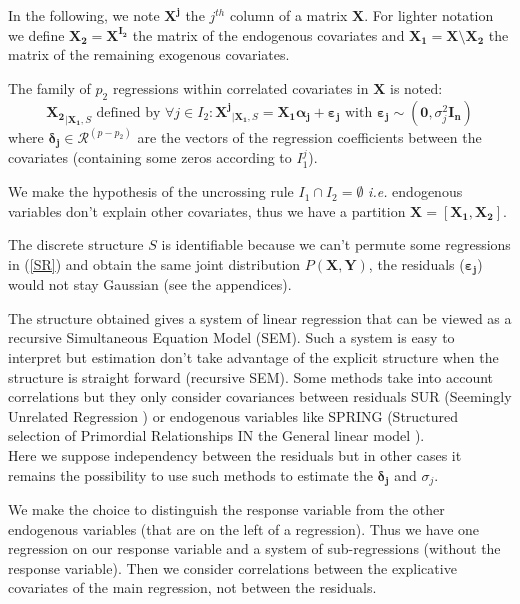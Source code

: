 \documentclass[11pt,a4paper]{article}
\begin{document}
In the following, we note $\boldsymbol{X^j}$ the $j^{th}$ column of a matrix $\boldsymbol{X}$.
For lighter notation we define $\boldsymbol{X_2}=\boldsymbol{X^{I_2}}$ the matrix of the endogenous covariates and $\boldsymbol{X_1}=\boldsymbol{X}\setminus \boldsymbol{X_2}$ the matrix of the remaining exogenous covariates. 

The family of $p_2$ regressions within correlated covariates in $\boldsymbol{X}$ is noted:
	\begin{equation}
		\boldsymbol{X_2}_{|\boldsymbol{X_1},S} \textrm{ defined by }\forall j \in I_2: \boldsymbol{X^j}_{|\boldsymbol{X_1},S}=\boldsymbol{X_1\alpha_j}+\boldsymbol{\varepsilon_j} \textrm{ with } \boldsymbol{\varepsilon_j} \sim(\boldsymbol{0},\sigma^2_j\boldsymbol{I_n}) \label{SR}
	\end{equation}
		where $\boldsymbol{\delta_j} \in \mathcal{R}^{(p-p_2)}$ are the vectors of the regression coefficients between the covariates (containing some zeros according to $I_1^j$).

We make the hypothesis of the uncrossing rule $I_1\cap I_2=\emptyset$ {\it i.e.} endogenous variables don't explain other covariates, thus we have a partition $\boldsymbol{X}=\left[\boldsymbol{X_1},\boldsymbol{X_2}\right]$.

The discrete structure $S$ is identifiable because we can't permute some regressions in (\ref{SR}) and obtain the same joint distribution $P(\boldsymbol{X},\boldsymbol{Y})$, the residuals ($\boldsymbol{\varepsilon_j}$) would not stay Gaussian (see the appendices).



The structure obtained gives a system of linear regression that can be viewed as a recursive Simultaneous Equation Model (\textsc{SEM})\cite{davidson1993estimation}. Such a system is easy to interpret but estimation don't take advantage of the explicit structure \cite{TIMM} when the structure is straight forward (recursive \textsc{SEM}).
  	Some methods take into account correlations but they only consider covariances between residuals \textsc{SUR} (Seemingly Unrelated Regression \cite{SURzellner}) or  endogenous variables like \textsc{SPRING} (Structured selection of Primordial Relationships IN the General linear model \cite{chiquetconf}). 
  	\\ Here we suppose independency between the residuals but in other cases it remains the possibility to use such methods to estimate the $\boldsymbol{\delta_j}$ and $\sigma_j$.

 	
	  We make the choice to distinguish the response variable from the other endogenous variables (that are on the left of a regression). Thus we have one regression on our response variable and a system of sub-regressions (without the response variable). Then we consider correlations between the explicative covariates of the main regression, not between the residuals.
	 
\end{document}
